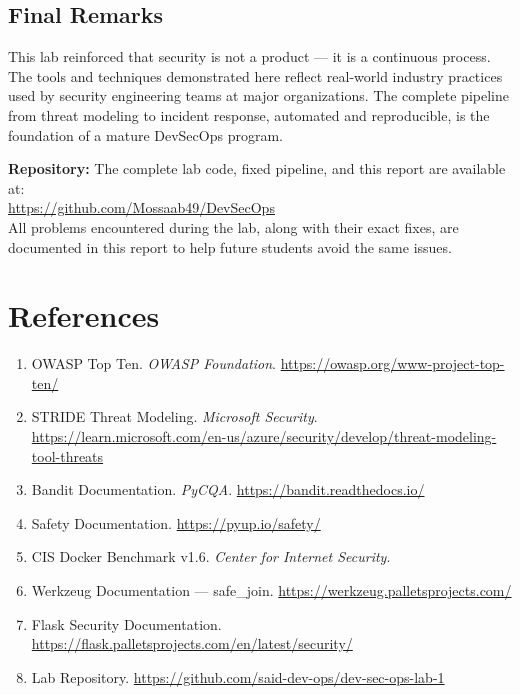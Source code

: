 \documentclass[12pt,a4paper]{report}
\begin{document}
\section{Final Remarks}

This lab reinforced that security is not a product — it is a continuous process. The tools and techniques demonstrated here reflect real-world industry practices used by security engineering teams at major organizations. The complete pipeline from threat modeling to incident response, automated and reproducible, is the foundation of a mature DevSecOps program.

\begin{infobox}
\textbf{Repository:} The complete lab code, fixed pipeline, and this report are available at:\\
\url{https://github.com/Mossaab49/DevSecOps}\\[4pt]
All problems encountered during the lab, along with their exact fixes, are documented in this report to help future students avoid the same issues.
\end{infobox}

\chapter*{References}

\begin{enumerate}
  \item OWASP Top Ten. \textit{OWASP Foundation}. \url{https://owasp.org/www-project-top-ten/}
  \item STRIDE Threat Modeling. \textit{Microsoft Security}. \url{https://learn.microsoft.com/en-us/azure/security/develop/threat-modeling-tool-threats}
  \item Bandit Documentation. \textit{PyCQA}. \url{https://bandit.readthedocs.io/}
  \item Safety Documentation. \url{https://pyup.io/safety/}
  \item CIS Docker Benchmark v1.6. \textit{Center for Internet Security}.
  \item Werkzeug Documentation — safe\_join. \url{https://werkzeug.palletsprojects.com/}
  \item Flask Security Documentation. \url{https://flask.palletsprojects.com/en/latest/security/}
  \item Lab Repository. \url{https://github.com/said-dev-ops/dev-sec-ops-lab-1}
\end{enumerate}
\end{document}
